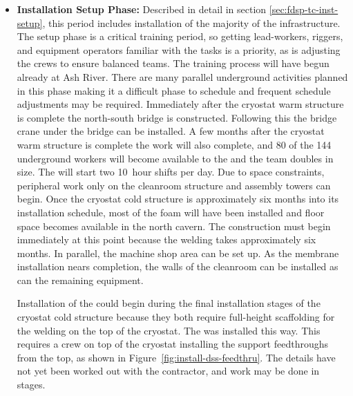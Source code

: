 \begin{itemize}
    \item {\bf Installation Setup Phase:}  Described in detail in section \ref{sec:fdsp-tc-inst-setup}, this period includes installation of  the majority of the infrastructure. The setup phase is a critical training period, so getting lead-workers, riggers, and equipment operators familiar with the tasks is a priority, as is  adjusting the crews to ensure balanced teams. The training process will have begun already at Ash River. 
    There are many parallel underground activities planned in this phase making it a difficult phase to schedule and frequent schedule adjustments may be required. Immediately after the cryostat warm structure is complete the north-south bridge is constructed. Following this the bridge crane under the bridge can be installed. A few months after the cryostat warm structure is complete the  work will also complete, and 80 of the 144 underground workers will become available to the  and the  team doubles in size. The  will start two \SI{10}{hour} shifts per day.  Due to space constraints, peripheral work only on the cleanroom structure and assembly towers can begin. Once the  cryostat cold structure is approximately six months into its installation schedule, most of the foam will have been installed and floor space becomes available in the north cavern. The \coldbox construction must begin immediately at this point because the welding takes approximately six months. In parallel, the machine shop area can be set up. As the membrane installation nears completion, the walls of the cleanroom can be installed as can the remaining equipment. 
    
    Installation of the  could begin during the final installation stages of the cryostat cold structure because they both require full-height scaffolding for the welding on the top of the cryostat. The   was installed this way. This requires a crew on top of the cryostat installing the  support feedthroughs from the top, as shown in Figure~\ref{fig:install-dss-feedthru}.  The details have not yet been worked out with the contractor, and work may be done in stages.


\end{itemize}
